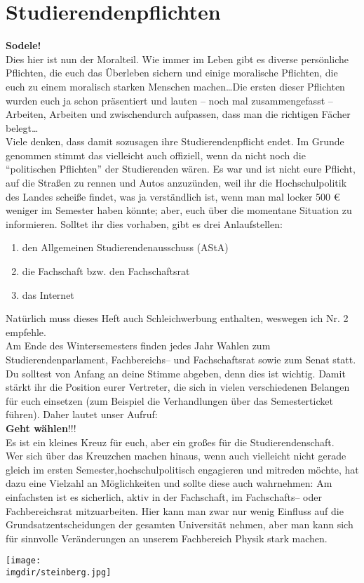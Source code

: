 \section{Studierendenpflichten}
\textbf{Sodele!}\\
Dies hier ist nun der Moralteil. Wie immer im Leben gibt es diverse persönliche Pflichten, die euch das Überleben sichern und einige moralische Pflichten, die euch zu einem moralisch starken Menschen machen\ldots Die ersten dieser Pflichten wurden euch ja schon präsentiert und lauten -- noch mal zusammengefasst -- Arbeiten, Arbeiten und zwischendurch aufpassen, dass man die richtigen Fächer belegt\ldots\\
Viele denken, dass damit sozusagen ihre Studierendenpflicht endet. Im Grunde genommen stimmt das vielleicht auch offiziell, wenn da nicht noch die \enquote{politischen Pflichten} der Studierenden wären. Es war und ist nicht eure Pflicht, auf die Stra\ss en zu rennen und Autos anzuzünden, weil ihr die Hochschulpolitik des Landes schei\ss e findet, was ja verständlich ist, wenn man mal locker 500 \euro{} weniger im Semester haben könnte; aber, euch über die momentane Situation zu informieren. Solltet ihr dies vorhaben, gibt es drei Anlaufstellen:
\begin{enumerate}
   \item den Allgemeinen Studierendenausschuss (AStA)
   \item die Fachschaft bzw. den Fachschaftsrat
   \item das Internet
\end{enumerate}
Natürlich muss dieses Heft auch Schleichwerbung enthalten, weswegen ich Nr. 2 empfehle.\\
Am Ende des Wintersemesters finden jedes Jahr Wahlen zum Studierendenparlament, Fachbereichs-- und Fachschaftsrat sowie zum Senat statt.\\
Du solltest von Anfang an deine Stimme abgeben, denn dies ist wichtig. Damit stärkt ihr die Position eurer Vertreter, die sich in vielen verschiedenen Belangen für euch einsetzen (zum Beispiel die Verhandlungen über das Semesterticket führen).
Daher lautet unser Aufruf:\\
\textbf{Geht wählen}!!!\\
Es ist ein kleines Kreuz für euch, aber ein gro\ss es für die Studierendenschaft.\\
Wer sich über das Kreuzchen machen hinaus, wenn auch vielleicht nicht gerade gleich im ersten Semester,hochschulpolitisch engagieren und mitreden möchte, hat dazu eine Vielzahl an Möglichkeiten und sollte diese auch wahrnehmen: Am einfachsten ist es sicherlich, aktiv in der Fachschaft, im Fachschafts-- oder Fachbereichsrat mitzuarbeiten. Hier kann man zwar nur wenig Einfluss auf die Grundsatzentscheidungen der gesamten Universität nehmen, aber man kann sich für sinnvolle Veränderungen an unserem Fachbereich Physik stark machen.
\begin{center}
  	\texttt{[image: \\imgdir/steinberg.jpg]}
\end{center}